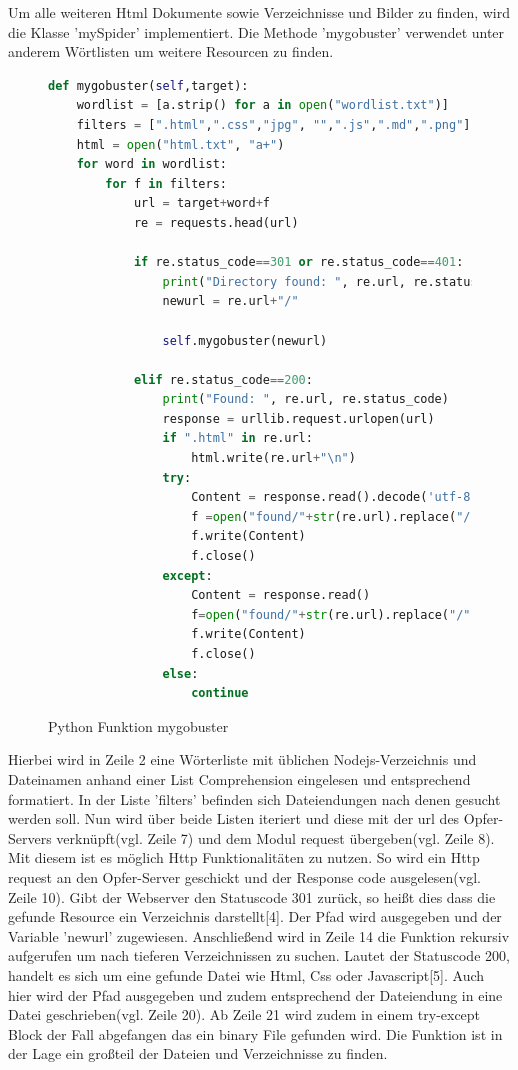 \documentclass[12pt]{article}
\begin{document}
\newpage
Um alle weiteren Html Dokumente sowie Verzeichnisse und Bilder zu finden, wird die Klasse 'mySpider' implementiert. Die Methode 'mygobuster' verwendet unter anderem Wörtlisten um weitere Resourcen zu finden.
\begin{figure}[h]
\caption{Python Funktion mygobuster}
\begin{lstlisting}[language=python, style=Code]
def mygobuster(self,target):
	wordlist = [a.strip() for a in open("wordlist.txt")]
	filters = [".html",".css","jpg", "",".js",".md",".png"]
	html = open("html.txt", "a+") 
	for word in wordlist:
		for f in filters:
			url = target+word+f
			re = requests.head(url)
		
			if re.status_code==301 or re.status_code==401:
				print("Directory found: ", re.url, re.status_code)
				newurl = re.url+"/"
			
				self.mygobuster(newurl)
			
			elif re.status_code==200:
				print("Found: ", re.url, re.status_code)
				response = urllib.request.urlopen(url)
				if ".html" in re.url:
					html.write(re.url+"\n")
				try:
					Content = response.read().decode('utf-8')
					f =open("found/"+str(re.url).replace("/",""), 'w+')
					f.write(Content)
					f.close()
				except:
					Content = response.read()
					f=open("found/"+str(re.url).replace("/",""), 'wb+')
					f.write(Content)
					f.close()
				else:
					continue
\end{lstlisting}
\end{figure}

Hierbei wird in Zeile 2 eine Wörterliste mit üblichen Nodejs-Verzeichnis und Dateinamen anhand einer List Comprehension eingelesen und entsprechend formatiert.
In der Liste 'filters' befinden sich Dateiendungen nach denen gesucht werden soll. Nun wird über beide Listen iteriert und diese mit der url des Opfer-Servers verknüpft(vgl. Zeile 7) und dem Modul request übergeben(vgl. Zeile 8). Mit diesem ist es möglich Http Funktionalitäten zu nutzen. So wird ein Http request an den Opfer-Server geschickt und der Response code ausgelesen(vgl. Zeile 10). Gibt der Webserver den Statuscode 301 zurück, so heißt dies dass die gefunde Resource ein Verzeichnis darstellt[4]. Der Pfad wird ausgegeben und der Variable 'newurl' zugewiesen. Anschließend wird in Zeile 14 die Funktion rekursiv aufgerufen um nach tieferen Verzeichnissen zu suchen. Lautet der Statuscode 200, handelt es sich um eine gefunde Datei wie Html, Css oder Javascript[5]. Auch hier wird der Pfad ausgegeben und zudem entsprechend
 der Dateiendung in eine Datei geschrieben(vgl. Zeile 20). Ab Zeile 21 wird zudem in einem try-except Block der Fall abgefangen das ein binary File gefunden wird.  
Die Funktion ist in der Lage ein großteil der Dateien und Verzeichnisse zu finden. 
\end{document}
